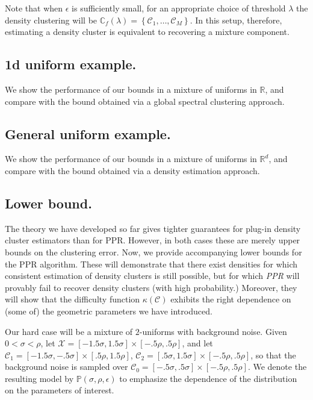 \documentclass[11pt,twoside]{article}
\newcommand{\set}[1]{\left\{#1\right\}}
\newcommand{\Reals}{\mathbb{R}}
\newcommand{\1}{\mathbf{1}}
\newcommand{\Pbb}{\mathbb{P}}
\newcommand{\Cbb}{\mathbb{C}}
\newcommand{\Cset}{\mathcal{C}}
\begin{document}
Note that when $\epsilon$ is sufficiently small, for an appropriate choice of threshold $\lambda$ the density clustering will be $\Cbb_f(\lambda) = \set{\Cset_1,\ldots,\Cset_M}$. In this setup, therefore, estimating a density cluster is equivalent to recovering a mixture component.
\subsection{1d uniform example.}

We show the performance of our bounds in a mixture of uniforms in $\Reals$, and compare with the bound obtained via a global spectral clustering approach.

\subsection{General uniform example.}

We show the performance of our bounds in a mixture of uniforms in $\Reals^d$, and compare with the bound obtained via a density estimation approach.

\subsection{Lower bound.}

The theory we have developed so far gives tighter guarantees for plug-in density cluster estimators than for PPR. However, in both cases these are merely upper bounds on the clustering error. Now, we provide accompanying lower bounds for the PPR algorithm. These will demonstrate that there exist densities for which consistent estimation of density clusters is still possible, but for which \emph{PPR} will provably fail to recover density clusters (with high probability.) Moreover, they will show that the difficulty function $\kappa(\Cset)$ exhibits the right dependence on (some of) the geometric parameters we have introduced.

Our hard case will be a mixture of $2$-uniforms with background noise. Given $0 < \sigma < \rho$, let $\mathcal{X} = [-1.5\sigma,1.5\sigma] \times [-.5\rho,.5\rho]$, and let $\Cset_1 = [-1.5\sigma,-.5\sigma] \times [.5\rho,1.5\rho]$, $\Cset_2 = [.5\sigma,1.5\sigma] \times [-.5\rho,.5\rho]$, so that the background noise is sampled over $\Cset_0 = [-.5\sigma,.5\sigma] \times [-.5\rho,.5\rho]$. We denote the resulting model by $\Pbb(\sigma,\rho,\epsilon)$ to emphasize the dependence of the distribution on the parameters of interest. 
\end{document}

